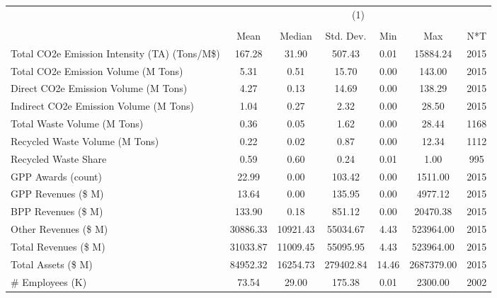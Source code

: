 {
\def\sym#1{\ifmmode^{#1}\else\(^{#1}\)\fi}
\begin{tabular}{l*{1}{cccccc}}
\hline\hline
                    &\multicolumn{6}{c}{(1)}                                                      \\
                    &\multicolumn{6}{c}{}                                                         \\
                    &        Mean&      Median&   Std. Dev.&         Min&         Max&         N*T\\
\hline
Total CO2e Emission Intensity (TA) (Tons/M\$)&      167.28&       31.90&      507.43&        0.01&    15884.24&        2015\\
Total CO2e Emission Volume (M Tons)&        5.31&        0.51&       15.70&        0.00&      143.00&        2015\\
Direct CO2e Emission Volume (M Tons)&        4.27&        0.13&       14.69&        0.00&      138.29&        2015\\
Indirect CO2e Emission Volume (M Tons)&        1.04&        0.27&        2.32&        0.00&       28.50&        2015\\
Total Waste Volume (M Tons)&        0.36&        0.05&        1.62&        0.00&       28.44&        1168\\
Recycled Waste Volume (M Tons)&        0.22&        0.02&        0.87&        0.00&       12.34&        1112\\
Recycled Waste Share&        0.59&        0.60&        0.24&        0.01&        1.00&         995\\
GPP Awards (count)  &       22.99&        0.00&      103.42&        0.00&     1511.00&        2015\\
GPP Revenues (\$ M) &       13.64&        0.00&      135.95&        0.00&     4977.12&        2015\\
BPP Revenues (\$ M) &      133.90&        0.18&      851.12&        0.00&    20470.38&        2015\\
Other Revenues (\$ M)&    30886.33&    10921.43&    55034.67&        4.43&   523964.00&        2015\\
Total Revenues (\$ M)&    31033.87&    11009.45&    55095.95&        4.43&   523964.00&        2015\\
Total Assets (\$ M) &    84952.32&    16254.73&   279402.84&       14.46&  2687379.00&        2015\\
\# Employees (K)    &       73.54&       29.00&      175.38&        0.01&     2300.00&        2002\\

\end{tabular}}
